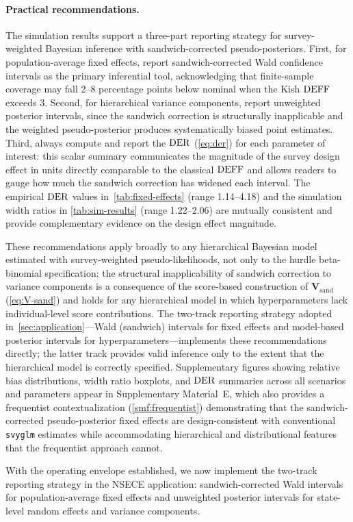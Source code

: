 \paragraph{Practical recommendations.}
The simulation results support a three-part reporting strategy for
survey-weighted Bayesian inference with sandwich-corrected
pseudo-posteriors. First, for population-average fixed effects, report
sandwich-corrected Wald confidence intervals as the primary inferential
tool, acknowledging that finite-sample coverage may fall 2--8 percentage
points below nominal when the Kish $\text{DEFF}$ exceeds 3. Second, for
hierarchical variance components, report unweighted posterior intervals,
since the sandwich correction is structurally inapplicable and the
weighted pseudo-posterior produces systematically biased point estimates.
Third, always compute and report the $\operatorname{DER}$ (\cref{eq:der}) for each
parameter of interest: this scalar summary communicates the magnitude of
the survey design effect in units directly comparable to the classical
$\text{DEFF}$ and allows readers to gauge how much the sandwich correction has
widened each interval. The empirical $\operatorname{DER}$ values
in~\cref{tab:fixed-effects} (range 1.14--4.18) and the simulation width
ratios in \cref{tab:sim-results} (range 1.22--2.06) are mutually
consistent and provide complementary evidence on the design effect
magnitude.

These recommendations apply broadly to any hierarchical
Bayesian model estimated with survey-weighted pseudo-likelihoods, not
only to the hurdle beta-binomial specification: the structural
inapplicability of sandwich correction to variance components is a
consequence of the score-based construction of $\mathbf{V}_{\mathrm{sand}}$
(\cref{eq:V-sand}) and holds for any hierarchical model in which
hyperparameters lack individual-level score contributions. The
two-track reporting strategy adopted in~\cref{sec:application}---Wald
(sandwich) intervals for fixed effects and model-based posterior intervals for
hyperparameters---implements these recommendations directly; the latter track
provides valid inference only to the extent that the hierarchical model is
correctly specified.
Supplementary figures showing relative bias distributions, width ratio
boxplots, and $\operatorname{DER}$ summaries across all scenarios and parameters
appear in Supplementary Material~E, which also provides a frequentist
contextualization (\cref{smf:frequentist}) demonstrating that the
sandwich-corrected pseudo-posterior fixed effects are design-consistent
with conventional \texttt{svyglm} estimates while accommodating
hierarchical and distributional features that the frequentist approach
cannot.

With the operating envelope established, we now implement the two-track
reporting strategy in the NSECE application: sandwich-corrected Wald
intervals for population-average fixed effects and unweighted posterior
intervals for state-level random effects and variance components.
